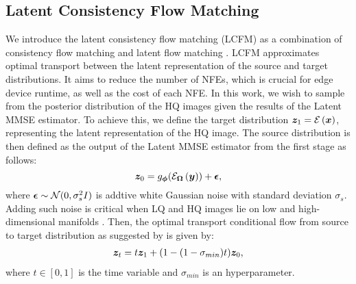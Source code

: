 \subsection{Latent Consistency Flow Matching}\label{lcfm}
We introduce the latent consistency flow matching (LCFM) as a combination of consistency flow matching \cite{yang2024consistencyfm} and latent flow matching \cite{dao2023flow}. LCFM approximates optimal transport between the latent representation of the source and target distributions. It aims to reduce the number of NFEs, which is crucial for edge device runtime, as well as the cost of each NFE. In this work, we wish to sample from the posterior distribution of the HQ images given the results of the Latent MMSE estimator. To achieve this, we define the target distribution $\bm{z}_1=\mathcal{E}\left(\bm{x}\right)$, representing the latent representation of the HQ image. The source distribution is then defined as the output of the Latent MMSE estimator from the first stage as follows:
$$\bm{z}_0=g_{\bm{\phi}}(\mathcal{E}_{\bm{\Omega}}\left(\bm{y}\right))+\bm{\epsilon},$$
where $\bm{\epsilon}\sim\mathcal{N}(0,\sigma^2_{s}I)$ is addtive white Gaussian noise with standard deviation $\sigma_{s}$. Adding such noise is critical when LQ and HQ images lie on low and high-dimensional manifolds \cite{AlbergoV23}. Then, the optimal transport conditional flow from source to target distribution as suggested by \citet{lipman2023flow} is given by:
\begin{align}\label{flow}
\bm{z}_t=t\bm{z}_{1} + (1-(1-\sigma_{min})t)\bm{z}_{0},
\end{align}
where $t\in [0,1]$ is the time variable and $\sigma_{min}$ is an hyperparameter. 


